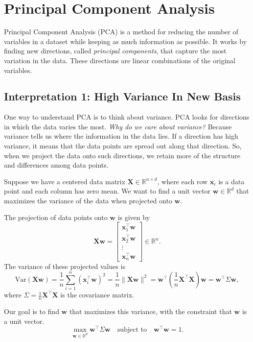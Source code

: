 \section{Principal Component Analysis}

Principal Component Analysis (PCA) is a method for reducing the number of variables in a dataset while keeping as much information as possible. It works by finding new directions, called \textit{principal components}, that capture the most variation in the data. These directions are linear combinations of the original variables. 

\subsection{Interpretation 1: High Variance In New Basis}

One way to understand PCA is to think about variance. PCA looks for directions in which the data varies the most. \textit{Why do we care about variance?} Because variance tells us where the information in the data lies. If a direction has high variance, it means that the data points are spread out along that direction. So, when we project the data onto such directions, we retain more of the structure and differences among data points.

Suppose we have a centered data matrix \(\mathbf{X} \in \mathbb{R}^{n \times d}\), where each row \(\mathbf{x}_i\) is a data point and each column has zero mean. We want to find a unit vector \(\mathbf{w} \in \mathbb{R}^d\) that maximizes the variance of the data when projected onto \(\mathbf{w}\).

The projection of data points onto \(\mathbf{w}\) is given by
\[
\mathbf{X} \mathbf{w} = \begin{bmatrix}
\mathbf{x}_1^\top \mathbf{w} \\
\mathbf{x}_2^\top \mathbf{w} \\
\vdots \\
\mathbf{x}_n^\top \mathbf{w}
\end{bmatrix}
\in \mathbb{R}^n.
\]
The variance of these projected values is
\[
\mathrm{Var}(\mathbf{X} \mathbf{w}) = \frac{1}{n} \sum_{i=1}^n (\mathbf{x}_i^\top \mathbf{w})^2 = \frac{1}{n} \| \mathbf{X} \mathbf{w} \|^2 = \mathbf{w}^\top \left( \frac{1}{n} \mathbf{X}^\top \mathbf{X} \right) \mathbf{w} = \mathbf{w}^\top \Sigma \mathbf{w},
\]
where \(\Sigma = \frac{1}{n} \mathbf{X}^\top \mathbf{X}\) is the covariance matrix.

Our goal is to find \(\mathbf{w}\) that maximizes this variance, with the constraint that \(\mathbf{w}\) is a unit vector.
\[
\max_{\mathbf{w} \in \mathbb{R}^d} \mathbf{w}^\top \Sigma \mathbf{w} \quad \text{subject to} \quad \mathbf{w}^\top \mathbf{w} = 1.
\]

